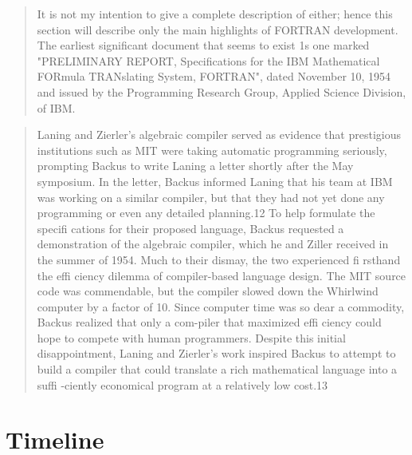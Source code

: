 \begin{quotation}
It is not my intention to give a complete description of either; hence this 
section will describe only the main highlights of FORTRAN development. The 
earliest significant document that seems to exist 1s one marked
"PRELIMINARY REPORT, Specifications for the IBM Mathematical FORmula 
TRANslating System, FORTRAN", dated November 10, 1954 and issued by the 
Programming Research Group, Applied Science Division, of IBM. 
\cite{sammet_programming_languages_history_and_fundamentals_1969}
\end{quotation}

\begin{quotation}
Laning and Zierler's algebraic compiler served as evidence that prestigious 
institutions such as MIT were taking automatic programming seriously, prompting 
Backus to write Laning a letter shortly after the May symposium. In the letter, 
Backus informed Laning that his team at IBM was working on a similar compiler, 
but that they had not yet done any programming or even any detailed planning.12 
To help formulate the specifi cations for their proposed language, Backus 
requested a demonstration of the algebraic compiler, which he and Ziller 
received in the summer of 1954. Much to their dismay, the two experienced fi 
rsthand the effi ciency dilemma of compiler-based language design. The MIT 
source code was commendable, but the compiler slowed down the Whirlwind 
computer by a factor of 10. Since computer time was so dear a commodity, Backus 
realized that only a com-piler that maximized effi ciency could hope to compete 
with human programmers. Despite this initial disappointment, Laning and 
Zierler's work inspired Backus to attempt to build a compiler that could 
translate a rich mathematical language into a suffi -ciently economical program 
at a relatively low cost.13
\cite{grace_hopper_and_the_invention_of_the_information_age_2009}
\end{quotation}

\pagebreak
\section{Timeline}

